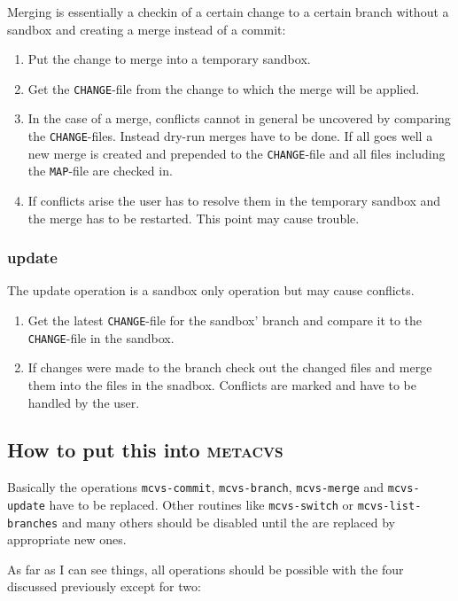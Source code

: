\documentclass[fleqn, 10pt, a4paper]{report}
\begin{document}
Merging is essentially a checkin of a certain change to a certain
branch without a sandbox and creating a merge instead of a commit:

\begin{enumerate}
\item Put the change to merge into a temporary sandbox.
\item Get the \texttt{CHANGE}-file from the change to which
the merge will be applied.
\item In the case of a merge, conflicts cannot in general
be uncovered by comparing the \texttt{CHANGE}-files. Instead
dry-run merges have to be done. If all goes well a new merge
is created and prepended to the \texttt{CHANGE}-file and all files
including the \texttt{MAP}-file are checked in.
\item If conflicts arise the user has to resolve them in the
temporary sandbox and the merge has to be restarted. This point
may cause trouble.
\end{enumerate}

\subsubsection{update}

The update operation is a sandbox only operation but may cause
conflicts.

\begin{enumerate}
\item Get the latest \texttt{CHANGE}-file for the sandbox' branch
and compare it to the \texttt{CHANGE}-file in the sandbox.
\item If changes were made to the branch check out the
changed files and merge them into the files in
the snadbox. Conflicts are marked and have to be handled by
the user.
\end{enumerate}

\subsection{How to put this into \textsc{metacvs}}
Basically the operations \texttt{mcvs-commit},
\texttt{mcvs-branch}, \texttt{mcvs-merge} and \texttt{mcvs-update}
have to be replaced. Other routines like \texttt{mcvs-switch} or
\texttt{mcvs-list-branches} and many others should be disabled
until the are replaced by appropriate new ones.

As far as I can see things, all operations should be possible with
the four discussed previously except for two:
\end{document}
